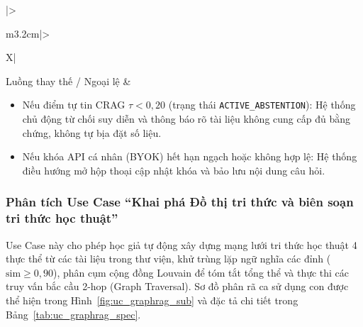 \begin{xltabular}{\textwidth}{|>{\raggedright\arraybackslash}m{3.2cm}|>{\raggedright\arraybackslash}X|}
\begin{itemize}[leftmargin=*, noitemsep, topsep=0pt]
\end{itemize} \tabularnewline \hline
Luồng thay thế / Ngoại lệ & 
\begin{itemize}[leftmargin=*, noitemsep, topsep=0pt]
    \item[--] Nếu điểm tự tin CRAG $\tau < 0{,}20$ (trạng thái \texttt{ACTIVE\_ABSTENTION}): Hệ thống chủ động từ chối suy diễn và thông báo rõ tài liệu không cung cấp đủ bằng chứng, không tự bịa đặt số liệu.
    \item[--] Nếu khóa API cá nhân (BYOK) hết hạn ngạch hoặc không hợp lệ: Hệ thống điều hướng mở hộp thoại cập nhật khóa và bảo lưu nội dung câu hỏi.
\end{itemize} \tabularnewline
\end{xltabular}
\endgroup
\FloatBarrier

\subsubsection{Phân tích Use Case ``Khai phá Đồ thị tri thức và biên soạn tri thức học thuật''}
\label{subsubsec:uc_graphrag}

Use Case này cho phép học giả tự động xây dựng mạng lưới tri thức học thuật 4 thực thể từ các tài liệu trong thư viện, khử trùng lặp ngữ nghĩa các đỉnh ($\text{sim} \ge 0{,}90$), phân cụm cộng đồng Louvain để tóm tắt tổng thể và thực thi các truy vấn bắc cầu 2-hop (Graph Traversal). Sơ đồ phân rã ca sử dụng con được thể hiện trong Hình~\ref{fig:uc_graphrag_sub} và đặc tả chi tiết trong Bảng~\ref{tab:uc_graphrag_spec}.

